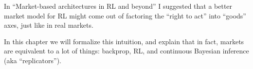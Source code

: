 In
``Market-based architectures in RL and beyond'' \citep{pallavisudhirMarketbasedArchitectures2025}
I suggested that a better market model for RL might come out of factoring the ``right to
act'' into ``goods'' axes, just like in real markets.

In this chapter we will formalize this intuition, and explain that in fact, markets are
equivalent to a lot of things: backprop, RL, and continuous Bayesian inference (aka
``replicators'').


